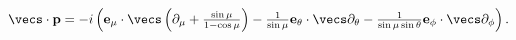 \begin{equation}
\vecs \cdot {\bf p} = -i \left( {\bf e_\mu} \cdot \vecs \left(\partial_\mu
+ \tfrac{\sin \mu}{1-\cos \mu}\right) - 
\tfrac{1}{\sin \mu} {\bf e_\theta} \cdot \vecs \partial_\theta 
- \tfrac{1}{\sin \mu \sin \theta} 
{\bf e_\phi} \cdot \vecs \partial_\phi
\right).
\end{equation}

